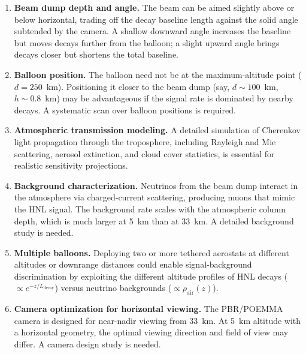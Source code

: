 \documentclass[11pt]{article}
\begin{document}
\begin{enumerate}
  \item \textbf{Beam dump depth and angle.}  The beam can be aimed
        slightly above or below horizontal, trading off the decay
        baseline length against the solid angle subtended by the
        camera.  A shallow downward angle increases the baseline but
        moves decays further from the balloon; a slight upward angle
        brings decays closer but shortens the total baseline.

  \item \textbf{Balloon position.}  The balloon need not be at the
        maximum-altitude point ($d = 250$~km).  Positioning it closer
        to the beam dump (say, $d \sim 100$~km, $h \sim 0.8$~km) may
        be advantageous if the signal rate is dominated by nearby decays.
        A systematic scan over balloon positions is required.

  \item \textbf{Atmospheric transmission modeling.}  A detailed
        simulation of Cherenkov light propagation through the
        troposphere, including Rayleigh and Mie scattering, aerosol
        extinction, and cloud cover statistics, is essential for
        realistic sensitivity projections.

  \item \textbf{Background characterization.}  Neutrinos from the beam
        dump interact in the atmosphere via charged-current scattering,
        producing muons that mimic the HNL signal.  The background
        rate scales with the atmospheric column depth, which is much
        larger at 5~km than at 33~km.  A detailed background study is
        needed.

  \item \textbf{Multiple balloons.}  Deploying two or more tethered
        aerostats at different altitudes or downrange distances could
        enable signal-background discrimination by exploiting the
        different altitude profiles of HNL decays
        ($\propto e^{-z/L_{\text{decay}}}$) versus neutrino backgrounds
        ($\propto \rho_{\text{air}}(z)$).

  \item \textbf{Camera optimization for horizontal viewing.}  The
        PBR/POEMMA camera is designed for near-nadir viewing from
        33~km.  At 5~km altitude with a horizontal geometry, the
        optimal viewing direction and field of view may differ.
        A camera design study is needed.
\end{enumerate}
\end{document}
